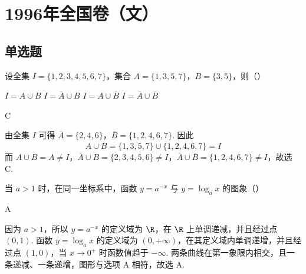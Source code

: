 \documentclass[UTF8,a4paper,oneside,11pt]{ctexbook}
\begin{document}
\mainmatter

\chapter{1996年全国卷（文）}
\section{单选题}

\begin{problem}
设全集 \(I = \{1, 2, 3, 4, 5, 6, 7\}\)，集合 \(A = \{1, 3, 5, 7\}\)，\(B = \{3, 5\}\)，则（\quad）

\choices
    {\(I = A\cup B\)}
    {\(I = \overline{A}\cup B\)}
    {\(I = A\cup \overline{B}\)}
    {\(I = \overline{A}\cup \overline{B}\)}
\end{problem}

\begin{answer}
C
\end{answer}

\begin{solution}
由全集 \(I\) 可得 \(\overline{A}=\{2,4,6\}\)，\(\overline{B}=\{1,2,4,6,7\}\). 因此
\[
A\cup\overline{B}=\{1,3,5,7\}\cup\{1,2,4,6,7\}=I
\]
而 \(A\cup B=A\ne I\)，\(\overline{A}\cup B=\{2,3,4,5,6\}\ne I\)，\(\overline{A}\cup\overline{B}=\{1,2,4,6,7\}\ne I\)，故选 C.
\end{solution}

\begin{problem}
当 \(a > 1\) 时，在同一坐标系中，函数 \(y = a^{-x}\) 与 \(y = \log_a x\) 的图象（\quad）

\choices
    {}
    {}
    {}
    {}
\end{problem}

\begin{answer}
A
\end{answer}

\begin{solution}
因为 \(a>1\)，所以 \(y=a^{-x}\) 的定义域为 \(\R\)，在 \(\R\) 上单调递减，并且经过点 \((0,1)\). 函数 \(y=\log_a x\) 的定义域为 \((0,+\infty)\)，在其定义域内单调递增，并且经过点 \((1,0)\)，当 \(x\to0^+\) 时函数值趋于 \(-\infty\). 两条曲线在第一象限内相交，且一条递减、一条递增，图形与选项 A 相符，故选 A.
\end{solution}
\end{document}
